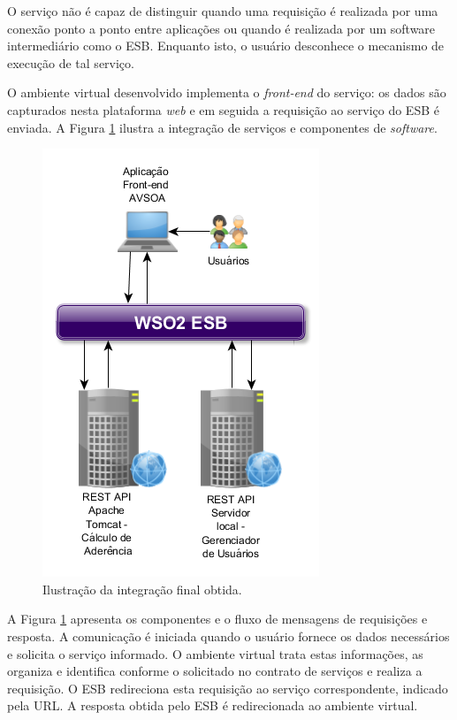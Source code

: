 O serviço não é capaz de distinguir quando uma requisição é realizada por uma conexão ponto a ponto entre aplicações ou quando é realizada por um software intermediário como o ESB. Enquanto isto, o usuário desconhece o mecanismo de execução de tal serviço.

O ambiente virtual desenvolvido implementa o \textit{front-end} do serviço: os dados são capturados nesta plataforma \textit{web} e em seguida a requisição ao serviço do ESB é enviada. A Figura  \ref{integracao_esb_front_rest_api_tcc} ilustra a integração de serviços e componentes de \textit{software}.

\begin{figure}[!hbt]
\centering
\includegraphics[scale=0.7]{figuras/integracao_esb_front_rest_api_tcc.png}
\caption{Ilustração da integração final obtida.}
\label{integracao_esb_front_rest_api_tcc}
\end{figure}

A Figura \ref{integracao_esb_front_rest_api_tcc} apresenta os componentes e o fluxo de mensagens de requisições e resposta. A comunicação é iniciada quando o usuário fornece os dados necessários e solicita o serviço informado. O ambiente virtual trata estas informações, as organiza e identifica conforme o solicitado no contrato de serviços e realiza a requisição. O ESB redireciona esta requisição ao serviço correspondente, indicado pela URL. A resposta obtida pelo ESB é redirecionada ao ambiente virtual.

